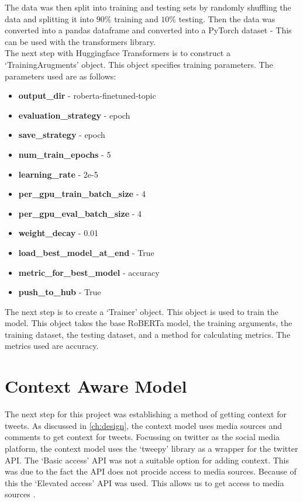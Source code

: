 The data was then split into training and testing sets by randomly shuffling the data and splitting it into $90\%$ training and $10\%$ testing.
Then the data was converted into a pandas dataframe and converted into a PyTorch dataset - This can be used with the transformers library.\\
The next step with Huggingface Transformers is to construct a `TrainingArugments' object. This object specifies training parameters. The parameters
used are as follows:
\begin{itemize}
    \item \textbf{output\_dir} - roberta-finetuned-topic
    \item \textbf{evaluation\_strategy} - epoch
    \item \textbf{save\_strategy} - epoch
    \item \textbf{num\_train\_epochs} - 5
    \item \textbf{learning\_rate} - 2e-5
    \item \textbf{per\_gpu\_train\_batch\_size} - 4
    \item \textbf{per\_gpu\_eval\_batch\_size} - 4
    \item \textbf{weight\_decay} - 0.01
    \item \textbf{load\_best\_model\_at\_end} - True
    \item \textbf{metric\_for\_best\_model} - accuracy
    \item \textbf{push\_to\_hub} - True
\end{itemize}

The next step is to create a `Trainer' object. This object is used to train the model. This object takes the base RoBERTa model, the training arguments,
the training dataset, the testing dataset, and a method for calculating metrics. The metrics used are accuracy. 
\section{Context Aware Model}\label{sec:context_aware_model}
The next step for this project was establishing a method of getting context for tweets. As discussed in \cref{ch:design}, the context model uses
media sources and comments to get context for tweets. Focussing on twitter as the social media platform, the context model uses the `tweepy' library
as a wrapper for the twitter API. The `Basic access' API was not a suitable option for adding context. This was due to the fact the API does not
procide access to media sources. Because of this the `Elevated access' API was used. This allows us to get access to media sources \cite{twitter_developer_nodate}.
